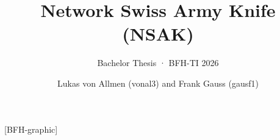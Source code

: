 \documentclass[
    english,
    aspectratio=169,
    authorontitle=true,
]{bfhbeamer}
\title{Network Swiss Army Knife (NSAK)}
\subtitle{Bachelor Thesis · BFH-TI 2026}
\author[]{Lukas von Allmen (vonal3) and Frank Gauss (gausf1)}
\institute{Bern University of Applied Sciences}
\begin{document}
[BFH-graphic]
\maketitle










\end{document}
